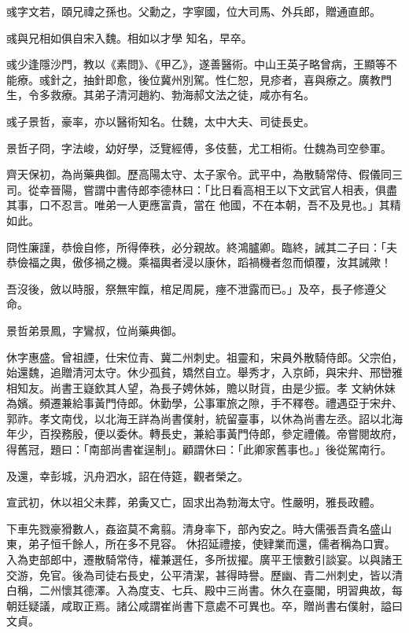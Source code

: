 \begin{pinyinscope}
 彧字文若，頤兄禕之孫也。父勳之，字寧國，位大司馬、外兵郎，贈通直郎。



 彧與兄相如俱自宋入魏。相如以才學
 知名，早卒。



 彧少逢隱沙門，教以《素問》、《甲乙》，遂善醫術。中山王英子略曾病，王顯等不能療。彧針之，抽針即愈，後位冀州別駕。性仁恕，見疹者，喜與療之。廣教門生，令多救療。其弟子清河趙約、勃海郝文法之徒，咸亦有名。



 彧子景哲，豪率，亦以醫術知名。仕魏，太中大夫、司徒長史。



 景哲子冏，字法峻，幼好學，泛覽經傅，多伎藝，尤工相術。仕魏為司空參軍。



 齊天保初，為尚藥典御。歷高陽太守、太子家令。武平中，為散騎常侍、假儀同三司。從幸晉陽，嘗謂中書侍郎李德林曰：「比日看高相王以下文武官人相表，俱盡其事，口不忍言。唯弟一人更應富貴，當在
 他國，不在本朝，吾不及見也。」其精如此。



 冏性廉謹，恭儉自修，所得俸秩，必分親故。終鴻臚卿。臨終，誡其二子曰：「夫恭儉福之輿，傲侈禍之機。乘福輿者浸以康休，蹈禍機者忽而傾覆，汝其誡歟！



 吾沒後，斂以時服，祭無牢餼，棺足周屍，瘞不泄露而已。」及卒，長子修遵父命。



 景哲弟景鳳，字鸞叔，位尚藥典御。



 休字惠盛。曾祖諲，仕宋位青、冀二州刺史。祖靈和，宋員外散騎侍郎。父宗伯，始還魏，追贈清河太守。休少孤貧，矯然自立。舉秀才，入京師，與宋弁、邢巒雅相知友。尚書王嶷欽其人望，為長子娉休姊，贍以財貨，由是少振。孝
 文納休妹為嬪。頻遷兼給事黃門侍郎。休勤學，公事軍旅之隙，手不釋卷。禮遇亞于宋弁、郭祚。孝文南伐，以北海王詳為尚書僕射，統留臺事，以休為尚書左丞。詔以北海年少，百揆務殷，便以委休。轉長史，兼給事黃門侍郎，參定禮儀。帝嘗閱故府，得舊冠，題曰：「南部尚書崔逞制」。顧謂休曰：「此卿家舊事也。」後從駕南行。



 及還，幸彭城，汎舟泗水，詔在侍筵，觀者榮之。



 宣武初，休以祖父未葬，弟夤又亡，固求出為勃海太守。性嚴明，雅長政體。



 下車先戮豪猾數人，姦盜莫不禽翦。清身率下，部內安之。時大儒張吾貴名盛山東，弟子恒千餘人，所在多不見容。
 休招延禮接，使肄業而還，儒者稱為口實。入為吏部郎中，遷散騎常侍，權兼選任，多所拔擢。廣平王懷數引談宴。以與諸王交游，免官。後為司徒右長史，公平清潔，甚得時譽。歷幽、青二州刺史，皆以清白稱，二州懷其德澤。入為度支、七兵、殿中三尚書。休久在臺閣，明習典故，每朝廷疑議，咸取正焉。諸公咸謂崔尚書下意處不可異也。卒，贈尚書右僕射，謚曰文貞。




\end{pinyinscope}
